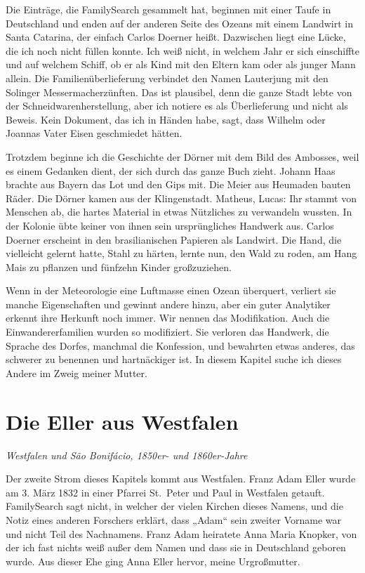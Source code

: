 \documentclass[
  ngerman,
  11pt,
  openany]{book}
\begin{document}
Die Einträge, die FamilySearch gesammelt hat, beginnen mit einer Taufe
in Deutschland und enden auf der anderen Seite des Ozeans mit einem
Landwirt in Santa Catarina, der einfach Carlos Doerner heißt. Dazwischen
liegt eine Lücke, die ich noch nicht füllen konnte. Ich weiß nicht, in
welchem Jahr er sich einschiffte und auf welchem Schiff, ob er als Kind
mit den Eltern kam oder als junger Mann allein. Die
Familienüberlieferung verbindet den Namen Lauterjung mit den Solinger
Messermacherzünften. Das ist plausibel, denn die ganze Stadt lebte von
der Schneidwarenherstellung, aber ich notiere es als Überlieferung und
nicht als Beweis. Kein Dokument, das ich in Händen habe, sagt, dass
Wilhelm oder Joannas Vater Eisen geschmiedet hätten.

Trotzdem beginne ich die Geschichte der Dörner mit dem Bild des
Ambosses, weil es einem Gedanken dient, der sich durch das ganze Buch
zieht. Johann Haas brachte aus Bayern das Lot und den Gips mit. Die
Meier aus Heumaden bauten Räder. Die Dörner kamen aus der Klingenstadt.
Matheus, Lucas: Ihr stammt von Menschen ab, die hartes Material in etwas
Nützliches zu verwandeln wussten. In der Kolonie übte keiner von ihnen
sein ursprüngliches Handwerk aus. Carlos Doerner erscheint in den
brasilianischen Papieren als Landwirt. Die Hand, die vielleicht gelernt
hatte, Stahl zu härten, lernte nun, den Wald zu roden, am Hang Mais zu
pflanzen und fünfzehn Kinder großzuziehen.

Wenn in der Meteorologie eine Luftmasse einen Ozean überquert, verliert
sie manche Eigenschaften und gewinnt andere hinzu, aber ein guter
Analytiker erkennt ihre Herkunft noch immer. Wir nennen das
Modifikation. Auch die Einwandererfamilien wurden so modifiziert. Sie
verloren das Handwerk, die Sprache des Dorfes, manchmal die Konfession,
und bewahrten etwas anderes, das schwerer zu benennen und hartnäckiger
ist. In diesem Kapitel suche ich dieses Andere im Zweig meiner Mutter.

\section{Die Eller aus Westfalen}\label{die-eller-aus-westfalen}

\emph{Westfalen und São Bonifácio, 1850er- und 1860er-Jahre}

Der zweite Strom dieses Kapitels kommt aus Westfalen. Franz Adam Eller
wurde am 3. März 1832 in einer Pfarrei St.~Peter und Paul in Westfalen
getauft. FamilySearch sagt nicht, in welcher der vielen Kirchen dieses
Namens, und die Notiz eines anderen Forschers erklärt, dass „Adam`` sein
zweiter Vorname war und nicht Teil des Nachnamens. Franz Adam heiratete
Anna Maria Knopker, von der ich fast nichts weiß außer dem Namen und
dass sie in Deutschland geboren wurde. Aus dieser Ehe ging Anna Eller
hervor, meine Urgroßmutter.
\end{document}

